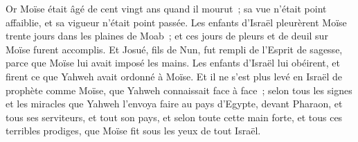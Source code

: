 \begin{multicols}{2}
Or Moïse était âgé de cent vingt ans quand il mourut~; sa vue n'était point affaiblie, et sa vigueur n'était point passée.
Les enfants d'Israël pleurèrent Moïse trente jours dans les plaines de Moab~; et ces jours de pleurs et de deuil sur Moïse furent accomplis.
Et Josué, fils de Nun, fut rempli de l'Esprit de sagesse, parce que Moïse lui avait imposé les mains. Les enfants d'Israël lui obéirent, et firent ce que Yahweh avait ordonné à Moïse.
Et il ne s'est plus levé en Israël de prophète comme Moïse, que Yahweh connaissait face à face~;
selon tous les signes et les miracles que Yahweh l'envoya faire au pays d'Egypte, devant Pharaon, et tous ses serviteurs, et tout son pays,
et selon toute cette main forte, et tous ces terribles prodiges, que Moïse fit sous les yeux de tout Israël.
\PPE{}
\end{multicols}
